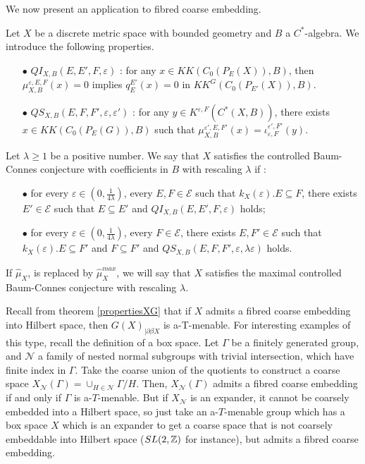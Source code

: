 We now present an application to fibred coarse embedding.

\begin{definition}
Let $X$ be a discrete metric space with bounded geometry and $B$ a $C^*$-algebra. We introduce the following properties.\\
\begin{itemize} 
\item[$\bullet$] $QI_{X,B}(E,E',F,\varepsilon)$ : for any $x\in KK(C_0(P_E(X)), B )$, then $\mu^{\varepsilon,E,F}_{X,B}(x) = 0$ implies $q_E^{E'}(x)=0$ in $KK^G(C_0(P_{E'}(X)),B)$.
\item[$\bullet$] $QS_{X,B}(E,F,F',\varepsilon,\varepsilon')$ : for any $y\in K^{\varepsilon,F}(C^*(X,B))$, there exists $x\in KK(C_0(P_E(G)),B)$ such that $\mu^{\varepsilon',E,F'}_{X,B}(x)=\iota_{\varepsilon,F}^{\varepsilon',F'}(y)$.\\
\end{itemize} 
Let $\lambda \geq 1$ be a positive number. We say that $X$ satisfies the controlled Baum-Connes conjecture with coefficients in $B$ with rescaling $\lambda$ if :
\begin{itemize} 
\item[$\bullet$] for every $\varepsilon \in (0,\frac{1}{4\lambda})$, every $E,F\in\mathcal E$ such that $k_X(\varepsilon).E\subseteq F$, there exists $E'\in \mathcal E$ such that $E \subseteq E'$ and $ QI_{X,B}(E,E',F,\varepsilon)$ holds; 
\item[$\bullet$] for every $\varepsilon \in (0,\frac{1}{4\lambda})$, every $F\in\mathcal E$, there exists $E,F'\in\mathcal E$ such that $k_X(\varepsilon).E \subseteq F'$ and $F\subseteq F'$ and $QS_{X,B}(E,F,F',\varepsilon,\lambda\varepsilon)$ holds. 
\end{itemize} 
If $\hat\mu_{X}$, is replaced by $\hat\mu^{max}_{X}$, we will say that $X$ satisfies the maximal controlled Baum-Connes conjecture with rescaling $\lambda$.\\
\end{definition}

Recall from theorem \ref{propertiesXG} that if $X$ admits a fibred coarse embedding into Hilbert space, then $G(X)_{|\partial \beta X}$ is a-T-menable. For interesting examples of this type, recall the definition of a box space. Let $\Gamma$ be a finitely generated group, and $\mathcal N$ a family of nested normal subgroups with trivial intersection, which have finite index in $\Gamma$. Take the coarse union of the quotients to construct a coarse space $X_{\mathcal N}(\Gamma)= \cup_{H\in \mathcal N } \Gamma/ H$. Then, $X_{\mathcal N}(\Gamma)$ admits a fibred coarse embedding if and only if $\Gamma$ is a-$T$-menable. But if $X_{\mathcal N}$ is an expander, it cannot be coarsely embedded into a Hilbert space, so just take an a-$T$-menable group which has a box space $X$ which is an expander to get a coarse space that is not coarsely embeddable into Hilbert space ($SL(2,\mathbb Z)$ for instance), but admits a fibred coarse embedding.\\

